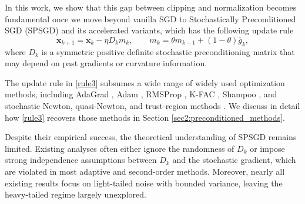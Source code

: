 \documentclass{article}
\newcommand{\bx}{\boldsymbol{x}}
\newcommand{\barg}{\bar{g}}
\theoremstyle{plain}
\theoremstyle{definition}
\theoremstyle{remark}
\begin{document}
In this work, we show that this gap between clipping and normalization becomes fundamental once we move beyond vanilla SGD to Stochastically Preconditioned SGD (SPSGD) and its accelerated variants, which has the following update rule
\begin{equation}\label{rule3}
\bx_{k+1} = \bx_k - \eta D_k m_k,
\qquad
m_k = \theta m_{k-1} + (1-\theta)\barg_k,
\end{equation}
where $D_k$ is a symmetric positive definite stochastic preconditioning matrix that may depend on past gradients or curvature information.





The update rule in \eqref{rule3} subsumes a wide range of widely used optimization methods, including AdaGrad \citep{Duchi2011Adaptive}, Adam \citep{Kingma2014Adam}, RMSProp \citep{Tieleman2012Lecture}, K-FAC \citep{martens2015optimizing}, Shampoo \citep{Gupta2018Shampoo}, and stochastic Newton, quasi-Newton, and trust-region methods \cite{bottou2018optimization,Wang2017Stochastic,Curtis2022Fully}. We discuss in detail how \eqref{rule3} recovers those methods in Section \ref{sec2:preconditioned_methods}.

Despite their empirical success, the theoretical understanding of SPSGD remains limited. Existing analyses often either ignore the randomness of $D_k$ or impose strong independence assumptions between $D_k$ and the stochastic gradient, which are violated in most adaptive and second-order methods. Moreover, nearly all existing results focus on light-tailed noise with bounded variance, leaving the heavy-tailed regime largely unexplored.
\end{document}
